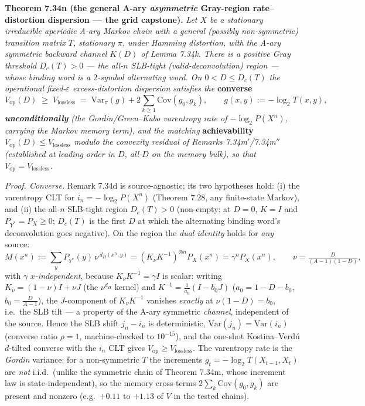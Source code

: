 \documentclass[
]{article}
\begin{document}
\textbf{Theorem 7.34n (the general A-ary \emph{asymmetric} Gray-region
rate--distortion dispersion --- the grid capstone).} \emph{Let $X$ be a
stationary irreducible aperiodic A-ary Markov chain with a general (possibly
non-symmetric) transition matrix $T$, stationary $\pi$, under Hamming distortion,
with the A-ary symmetric backward channel $K(D)$ of Lemma 7.34k. There is a
positive Gray threshold $D_c(T)>0$ --- the all-$n$ SLB-tight
(valid-deconvolution) region --- whose binding word is a $2$-symbol alternating
word. On $0<D\le D_c(T)$ the operational fixed-$\varepsilon$ excess-distortion
dispersion satisfies the} \textbf{converse}
\[
  V_{\mathrm{op}}(D)\;\ge\;V_{\mathrm{lossless}}
  \;=\;\mathrm{Var}_\pi(g)+2\sum_{k\ge1}\mathrm{Cov}(g_0,g_k),\qquad
  g(x,y):=-\log_2 T(x,y),
\]
\emph{\textbf{unconditionally}} \emph{(the Gordin/Green--Kubo varentropy rate of
$-\log_2 P(X^n)$, carrying the Markov memory term), and the matching}
\textbf{achievability} \emph{$V_{\mathrm{op}}(D)\le V_{\mathrm{lossless}}$ modulo
the convexity residual of Remarks 7.34m$'$/7.34m$''$ (established at leading order
in $D$, all-$D$ on the memory bulk), so that $V_{\mathrm{op}}=V_{\mathrm{lossless}}$.}

\emph{Proof. Converse.} Remark 7.34d is source-agnostic; its two hypotheses hold:
(i) the varentropy CLT for $i_n=-\log_2 P(X^n)$ (Theorem 7.28, any finite-state
Markov), and (ii) the all-$n$ SLB-tight region $D_c(T)>0$ (non-empty: at $D=0$,
$K=I$ and $P_{Y^*}=P_X\ge0$; $D_c(T)$ is the first $D$ at which the alternating
binding word's deconvolution goes negative). On the region the \emph{dual
identity} holds for \emph{any} source:
\[
  M(x^n):=\sum_y P_{Y^*}(y)\,\nu^{\,d_H(x^n,y)}
  =(K_\nu K^{-1})^{\otimes n}P_X(x^n)=\gamma^n P_X(x^n),
  \qquad \nu=\tfrac{D}{(A-1)(1-D)},
\]
with $\gamma$ \emph{$x$-independent}, because $K_\nu K^{-1}=\gamma I$ is scalar:
writing $K_\nu=(1-\nu)I+\nu J$ (the $\nu^{d_H}$ kernel) and
$K^{-1}=\tfrac1{a_0}(I-b_0 J)$ ($a_0=1-D-b_0$, $b_0=\tfrac D{A-1}$), the
$J$-component of $K_\nu K^{-1}$ vanishes \emph{exactly} at $\nu(1-D)=b_0$, i.e.\
the SLB tilt --- a property of the A-ary symmetric \emph{channel}, independent of
the source. Hence the SLB shift $j_n-i_n$ is deterministic,
$\mathrm{Var}(j_n)=\mathrm{Var}(i_n)$ (converse ratio $\rho=1$, machine-checked to
$10^{-15}$), and the one-shot Kostina--Verd\'u $d$-tilted converse with the $i_n$
CLT gives $V_{\mathrm{op}}\ge V_{\mathrm{lossless}}$. The varentropy rate is the
\emph{Gordin} variance: for a non-symmetric $T$ the increments
$g_t=-\log_2 T(X_{t-1},X_t)$ are \emph{not} i.i.d.\ (unlike the symmetric chain of
Theorem 7.34m, whose increment law is state-independent), so the memory
cross-terms $2\sum_k\mathrm{Cov}(g_0,g_k)$ are present and nonzero (e.g.\ $+0.11$
to $+1.13$ of $V$ in the tested chains).
\end{document}

